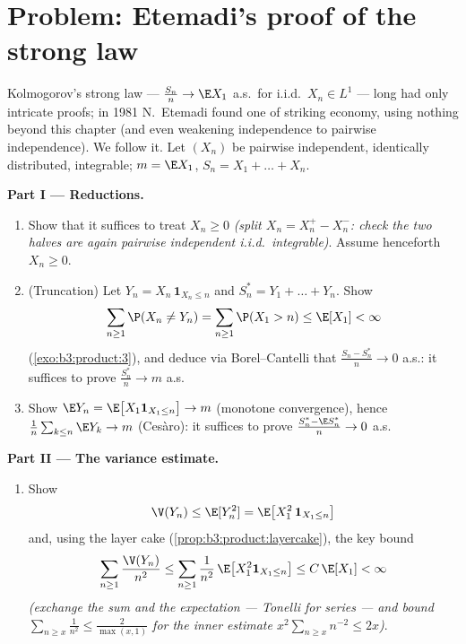 \section{Problem: Etemadi's proof of the strong law}

\begin{problem}
\label{pb:b3:probability:1}
Kolmogorov's strong law --- $\frac{S_n}n \to \E X_1$ a.s.\
for i.i.d.\ $X_n \in L^1$ --- long had only intricate proofs;
in 1981 N.~Etemadi found one of striking economy, using
nothing beyond this chapter (and even weakening independence
to pairwise independence). We follow it. Let $(X_n)$ be
pairwise independent, identically distributed, integrable;
$m = \E X_1$, $S_n = X_1 + \dots + X_n$.

\medskip
\noindent\textbf{Part I --- Reductions.}
\begin{enumerate}
  \item Show that it suffices to treat $X_n \geq 0$
        \emph{(split $X_n = X_n^+ - X_n^-$: check the two
        halves are again pairwise independent i.i.d.\
        integrable)}. Assume henceforth $X_n \geq 0$.
  \item (Truncation) Let $Y_n = X_n\,\mathbf 1_{X_n \leq n}$
        and $S_n^* = Y_1 + \dots + Y_n$. Show
        \[
        \sum_{n\geq1}\P(X_n \neq Y_n) =
        \sum_{n\geq1}\P(X_1 > n) \leq \E[X_1] < \infty
        \]
        (\cref{exo:b3:product:3}), and deduce via
        Borel--Cantelli that $\frac{S_n - S_n^*}{n} \to 0$
        a.s.: it suffices to prove $\frac{S^*_n}n \to m$
        a.s.
  \item Show $\E Y_n = \E\bigl[X_1\mathbf 1_{X_1\leq
        n}\bigr] \to m$ (monotone convergence), hence
        $\frac1n\sum_{k\leq n}\E Y_k \to m$ (Ces\`aro): it
        suffices to prove $\frac{S_n^* - \E S_n^*}{n} \to 0$
        a.s.
\end{enumerate}

\medskip
\noindent\textbf{Part II --- The variance estimate.}
\begin{enumerate}[resume]
  \item Show
        \[
        \V(Y_n) \leq \E[Y_n^2] = \E\bigl[X_1^2\,\mathbf
        1_{X_1 \leq n}\bigr]
        \]
        and, using the layer cake
        (\cref{prop:b3:product:layercake}), the key bound
        \[
        \sum_{n\geq1}\frac{\V(Y_n)}{n^2}
        \leq \sum_{n\geq1}\frac1{n^2}\,
        \E\bigl[X_1^2\mathbf 1_{X_1\leq n}\bigr]
        \leq C\,\E[X_1] < \infty
        \]
        \emph{(exchange the sum and the expectation ---
        Tonelli for series --- and bound $\sum_{n \geq
        x}\frac1{n^2} \leq \frac2{\max(x,1)}$ for the inner
        estimate $x^2\sum_{n\geq x}n^{-2} \leq 2x$)}.
\end{enumerate}


\end{problem}
